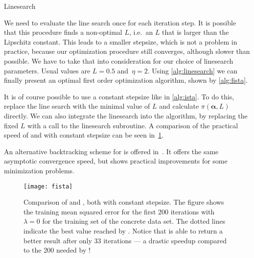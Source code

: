 \begin{algorithm}[h!]
 \caption{Linesearch~\cite{fista}}\label{alg:linesearch}
 \begin{algorithmic}[1]
  \Statex
    \Do
    \State {} 
  \EndFunction
 \end{algorithmic}
\end{algorithm}

We need to evaluate the line search once for each iteration step.
It is possible that this procedure finds a non-optimal \(L\), i.e.~an \(L\) that
is larger than the Lipschitz constant.
This leads to a smaller stepsize, which is not a problem in practice, because
our optimization procedure still converges, although slower than possible.
We have to take that into consideration for our choice of linesearch parameters.
Usual values are \(L = 0.5\) and~\(\eta = 2\).
Using \cref{alg:linesearch} we can finally present an optimal first order optimization algorithm, shown by \cref{alg:fista}.

It is of course possible to use a constant stepsize like in \cref{alg:ista}.
To do this, replace the line search with the minimal value of \(L\) and
calculate \(\pi(\bm{\alpha}, L)\) directly.
We can also integrate the linesearch into the \ista algorithm, by replacing the
fixed \(L\) with a call to the linesearch subroutine.
A comparison of the practical speed of \ista and \fista with constant stepsize can be seen in~\cref{fig:fista-convergence}.

An alternative backtracking scheme for \fista is offered in~\cite{fista-backtracking}.
It offers the same asymptotic convergence speed, but shows practical improvements for some minimization problems.

\begin{figure}[bt]
  \texttt{[image: fista]}
  \caption[Comparison of \fista and \ista]{Comparison of \fista and \ista, both with constant stepsize.
    The figure shows the training mean squared error for the first 200
    iterations with \(\lambda = 0\) for the training set of the concrete
    data set.
    The dotted lines indicate the best value reached by \ista.
    Notice that \fista is able to return a better result after only 33
    iterations ---
    a drastic speedup compared to the 200 needed by \ista!
  }\label{fig:fista-convergence}
\end{figure}


